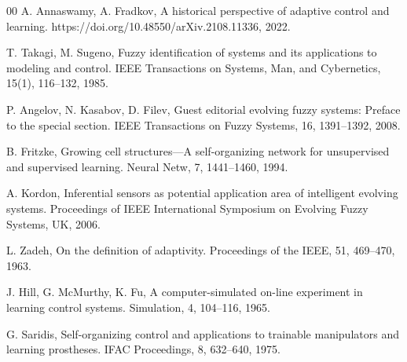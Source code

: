 \documentclass[conference]{IEEEtran}
\begin{document}
\begin{thebibliography}{00}
 A. Annaswamy, A. Fradkov, A historical perspective of adaptive control and learning. https://doi.org/10.48550/arXiv.2108.11336, 2022.

 T. Takagi, M. Sugeno, Fuzzy identification of systems and its applications to modeling and control. IEEE Transactions on Systems, Man, and Cybernetics, 15(1), 116–132, 1985.

 P. Angelov, N. Kasabov, D. Filev, Guest editorial evolving fuzzy systems: Preface to the special section. IEEE Transactions on Fuzzy Systems, 16, 1391–1392, 2008.

 B. Fritzke, Growing cell structures—A self-organizing network for unsupervised and supervised learning. Neural Netw, 7, 1441–1460, 1994.

 A. Kordon, Inferential sensors as potential application area of intelligent evolving systems. Proceedings of IEEE International Symposium on Evolving Fuzzy Systems, UK, 2006.

 L. Zadeh, On the definition of adaptivity. Proceedings of the IEEE, 51, 469–470, 1963.

 J. Hill, G. McMurthy, K. Fu, A computer-simulated on-line experiment in learning control systems. Simulation, 4, 104–116, 1965.

 G. Saridis, Self-organizing control and applications to trainable manipulators and learning prostheses. IFAC Proceedings, 8, 632–640, 1975.





\end{thebibliography}
\end{document}
